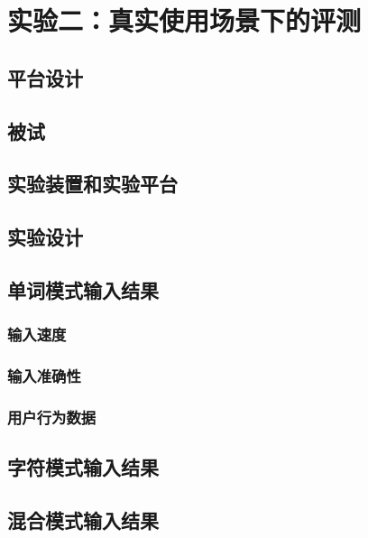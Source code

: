 \chapter{实验二：真实使用场景下的评测} %
\label{cha:evaluation}
\section{平台设计}
\section{被试}
\section{实验装置和实验平台}
\section{实验设计}
\section{单词模式输入结果}
\subsection{输入速度}
\subsection{输入准确性}
\subsection{用户行为数据}
\section{字符模式输入结果}
\section{混合模式输入结果}